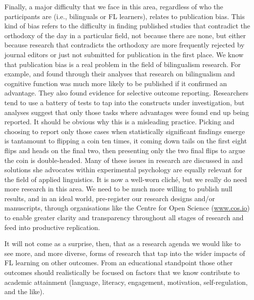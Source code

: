 \documentclass[output=paper]{langscibook}
\begin{document}
Finally, a major difficulty that we face in this area, regardless of who the participants are (i.e., bilinguals or FL learners), relates to publication bias. This kind of bias refers to the difficulty in finding published studies that contradict the orthodoxy of the day in a particular field, not because there are none, but either because research that contradicts the orthodoxy are more frequently rejected by journal editors or just not submitted for publication in the first place. We know that publication bias is a real problem in the field of bilingualism research. For example, \citet{DeBruinEtAl2015} and \citet{LehtonenEtAl2018} found through their analyses that research on bilingualism and cognitive function was much more likely to be published if it confirmed an advantage. They also found evidence for selective outcome reporting. Researchers tend to use a battery of tests to tap into the constructs under investigation, but analyses suggest that only those tasks where advantages were found end up being reported. It should be obvious why this is a misleading practice. Picking and choosing to report only those cases when statistically significant findings emerge is tantamount to flipping a coin ten times, it coming down tails on the first eight flips and heads on the final two, then presenting only the two final flips to argue the coin is double-headed. Many of these issues in research are discussed in \citet{Bishop2020} and solutions she advocates within experimental psychology are equally relevant for the field of applied linguistics. It is now a well-worn cliché, but we really do need more research in this area. We need to be much more willing to publish null results, and in an ideal world, pre-register our research designs and/or manuscripts, through organisations like the Centre for Open Science (\url{www.cos.io}) to enable greater clarity and transparency throughout all stages of research and feed into productive replication.

It will not come as a surprise, then, that as a research agenda we would like to see more, and more diverse, forms of research that tap into the wider impacts of FL learning on other outcomes. From an educational standpoint those other outcomes should realistically be focused on factors that we know contribute to academic attainment (language, literacy, engagement, motivation, self-regulation, and the like). 
\end{document}
